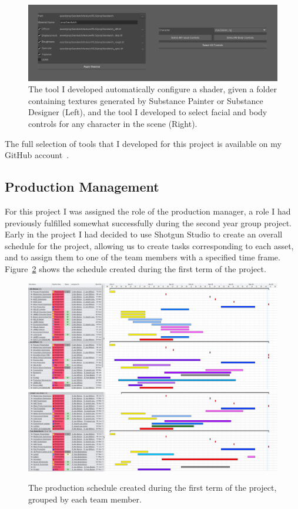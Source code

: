 \documentclass[11pt]{article}
\begin{document}
\begin{figure}[htbp]
\centering
\includegraphics[width=1.0\linewidth]{images/miscScripts.png}
\caption{\label{figure:miscScripts} The tool I developed automatically configure a shader, given a folder containing textures generated by Substance Painter or Substance Designer (Left), and the tool I developed to select facial and body controls for any character in the scene (Right).}
\end{figure}

The full selection of tools that I developed for this project is available on my GitHub account~\cite{myGitHub}.

\subsection{Production Management} \label{productionManagement}

For this project I was assigned the role of the production manager, a role I had previously fulfilled somewhat successfully during the second year group project. Early in the project I had decided to use Shotgun Studio to create an overall schedule for the project, allowing us to create tasks corresponding to each asset, and to assign them to one of the team members with a specified time frame. Figure~\ref{figure:schedule} shows the schedule created during the first term of the project.

\begin{figure}[htbp]
\centering
\includegraphics[width=1.0\linewidth]{images/schedule01.png}
\includegraphics[width=1.0\linewidth]{images/schedule02.png}
\caption{\label{figure:schedule} The production schedule created during the first term of the project, grouped by each team member.}
\end{figure}
\end{document}
